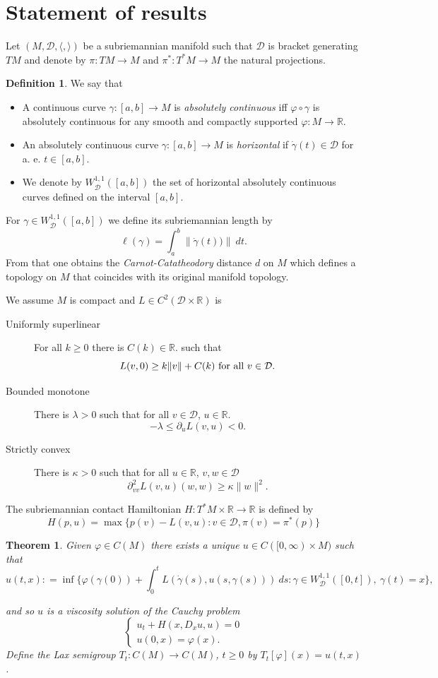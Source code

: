 \documentclass[12pt]{amsart}
\theoremstyle{plain}
\newtheorem{theorem}{Theorem}
\theoremstyle{definition}
\newtheorem{definition}{Definition}
\newcommand{\R}{\mathbb R}
\newcommand{\cD}{\mathcal D}
\newcommand{\cW}{W^{1,1}}
\newcommand{\cWD}{\cW_\cD}
\newcommand{\fui}{\varphi}
\newcommand{\ga}{\gamma}
\newcommand{\ka}{\kappa}
\newcommand{\la}{\lambda}
\newcommand{\dga}{\dot\gamma}
\newcommand{\rip}{\rangle}
\newcommand{\lip}{\langle}
\begin{document}
\section{Statement of results}
\label{sec:results}
Let $(M, \cD, \lip,\rip)$ be a subriemannian manifold such that
$\cD$ is bracket generating $TM$ and denote by $\pi:TM\to M$
and $\pi^*:T^*M\to M$ the natural projections.
\begin{definition}We say that
  \begin{itemize}
  \item 
 A continuous curve $\ga : [a, b]\to M$ is {\em absolutely continuous} iff
$\fui\circ\ga$ is  absolutely continuous for any smooth and compactly
supported $\fui:M\to\R$.
 \item 
An absolutely continuous curve $\ga:[a,b]\to M$ is {\em horizontal} if
$\dga(t)\in\cD$  for a. e. $t\in[a,b]$.
\item
 We denote by $\cWD([a,b])$
the set of horizontal absolutely continuous curves defined on the
interval $[a,b]$. 
\end{itemize}
For $\ga\in\cWD([a,b])$ we define its
subriemannian length by
\[\ell(\ga)=\int_a^b\|\dga(t))\|\ dt.\]
From that one obtains the {\em Carnot-Catatheodory} distance $d$ on $M$ which
defines a topology on $M$ that coincides with its
original manifold topology.
\end{definition}
We assume $M$ is compact and $L\in C^2(\cD\times\R)$ is
\begin{description}
  \item [Uniformly superlinear] For all $k\ge 0$ there is $C(k)\in\R$.
  such that \[L(v,0)\ge k\|v\|+C(k)\hbox{ for all }v\in\cD.\]
\item[Bounded monotone] There is $\la>0$ such that for all $v\in\cD$, $u\in\R$.
  \[-\la \le\partial_uL(v,u)<0.\]
\item [Strictly convex] There is  $\ka>0$ such that for all
  $u\in\R$, $v,w\in\cD$
  \[\partial_{vv}^2L(v,u)  (w,w)\ge\ka\|w\|^2.\]  
\end{description}
The subriemannian contact Hamiltonian $H:T^*M\times\R\to\R$ is defined by
\[H(p,u)=\max\{p(v)-L(v,u):v\in\cD, \pi(v)=\pi^*(p)\}\]
\begin{theorem}\label{main-evolution}
Given $\fui\in C(M)$ there exists a unique $u\in C([0,\infty)\times M)$ such that
\[u(t,x):
 =\inf\{\fui(\ga(0))+\int_0^tL(\dga(s),u(s,\ga(s)))\ ds:\ga\in\cWD([0,t]),\ \ga(t)=x\},\]

and so $u$ is a viscosity solution of the Cauchy problem
\begin{equation}\label{cauchy}
  \begin{cases} u_t+H(x,D_xu,u)=0\\ u(0,x)=\fui(x).   \end{cases}
\end{equation}
Define the Lax semigroup $T_t:C(M)\to C(M)$, $t\ge 0$ by $T_t[\fui](x)=u(t,x)$.
\end{theorem}
\end{document}
